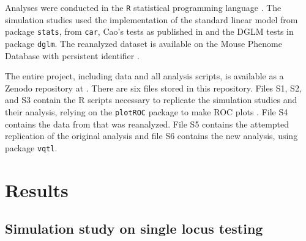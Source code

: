 Analyses were conducted in the \texttt{R} statistical programming language \citep{RCoreTeam2017}.
The simulation studies used the implementation of the standard linear model from package \texttt{stats}, \Lev from \texttt{car}, Cao's tests as published in \cite{Cao2014} and the DGLM tests in package \texttt{dglm}.
The reanalyzed dataset is available on the Mouse Phenome Database \citep{Grubb2014a} with persistent identifier \mpdidentifier.

The entire project, including data and all analysis scripts, is available as a Zenodo repository at \zenodourl.
There are six files stored in this repository.
Files S1, S2, and S3 contain the R scripts necessary to replicate the simulation studies and their analysis, relying on the \texttt{plotROC} package to make ROC plots \citep{sachs2017plotroc}.
File S4 contains the data from \cite{Leamy2000} that was reanalyzed.
File S5 contains the attempted replication of the original analysis \citep{Yi2006} and file S6 contains the new analysis, using package \texttt{vqtl}.




\section{Results}

\subsection{Simulation study on single locus testing}

